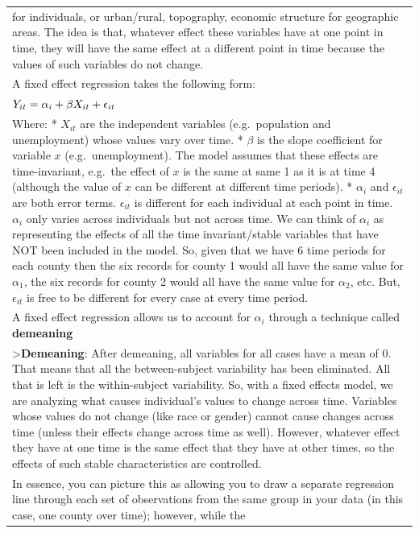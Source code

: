 \documentclass[
  letterpaper,
  DIV=11,
  numbers=noendperiod]{scrreprt}
\begin{document}
\begin{longtable}[]{@{}
  >{\raggedright\arraybackslash}p{}@{}}
for individuals, or urban/rural, topography, economic structure for
geographic areas. The idea is that, whatever effect these variables have
at one point in time, they will have the same effect at a different
point in time because the values of such variables do not change. \\
A fixed effect regression takes the following form: \\
\(\huge Y_{it}=\alpha_i+\beta X_{it}+\epsilon_{it}\) \\
Where: * \(X_{it}\) are the independent variables (e.g.~population and
unemployment) whose values vary over time. * \(\beta\) is the slope
coefficient for variable \(x\) (e.g.~unemployment). The model assumes
that these effects are time-invariant, e.g.~the effect of \(x\) is the
same at same 1 as it is at time 4 (although the value of \(x\) can be
different at different time periods). * \(\alpha_i\) and
\(\epsilon_{it}\) are both error terms. \(\epsilon_{it}\) is different
for each individual at each point in time. \(\alpha_i\) only varies
across individuals but not across time. We can think of \(\alpha_i\) as
representing the effects of all the time invariant/stable variables that
have NOT been included in the model. So, given that we have 6 time
periods for each county then the six records for county 1 would all have
the same value for \(\alpha_1\), the six records for county 2 would all
have the same value for \(\alpha_2\), etc. But, \(\epsilon_{it}\) is
free to be different for every case at every time period. \\
A fixed effect regression allows us to account for \(\alpha_i\) through
a technique called \textbf{demeaning} \\
\textgreater{}\textbf{Demeaning}: After demeaning, all variables for all
cases have a mean of 0. That means that all the between-subject
variability has been eliminated. All that is left is the within-subject
variability. So, with a fixed effects model, we are analyzing what
causes individual's values to change across time. Variables whose values
do not change (like race or gender) cannot cause changes across time
(unless their effects change across time as well). However, whatever
effect they have at one time is the same effect that they have at other
times, so the effects of such stable characteristics are controlled. \\
In essence, you can picture this as allowing you to draw a separate
regression line through each set of observations from the same group in
your data (in this case, one county over time); however, while the

\end{longtable}
\end{document}
